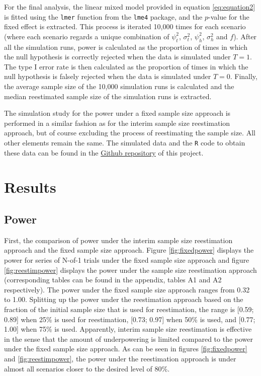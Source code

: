 \documentclass[AMA,STIX1COL,]{WileyNJD-v2}
\begin{document}
For the final analysis, the linear mixed model provided in equation \eqref{eq:equation2} is fitted using the \texttt{lmer} function from the \texttt{lme4} package, and the \(p\)-value for the fixed effect is extracted. This process is iterated 10,000 times for each scenario (where each scenario regards a unique combination of \(\psi_t^2\), \(\sigma_t^2\), \(\psi_h^2\), \(\sigma_h^2\) and \(f\)). After all the simulation runs, power is calculated as the proportion of times in which the null hypothesis is correctly rejected when the data is simulated under \(T=1\). The type I error rate is then calculated as the proportion of times in which the null hypothesis is falsely rejected when the data is simulated under \(T=0\). Finally, the average sample size of the 10,000 simulation runs is calculated and the median reestimated sample size of the simulation runs is extracted.

The simulation study for the power under a fixed sample size approach is performed in a similar fashion as for the interim sample size reestimation approach, but of course excluding the process of reestimating the sample size. All other elements remain the same. The simulated data and the \texttt{R} code to obtain these data can be found in the \href{https://github.com/daphneweemering/MasterThesis}{Github repository} of this project.

\hypertarget{results}{%
\section{Results}\label{results}}

\hypertarget{power}{%
\subsection{Power}\label{power}}

First, the comparison of power under the interim sample size reestimation approach and the fixed sample size approach. Figure \ref{fig:fixedpower} displays the power for series of N-of-1 trials under the fixed sample size approach and figure \ref{fig:reestimpower} displays the power under the sample size reestimation approach (corresponding tables can be found in the appendix, tables A1 and A2 respectively). The power under the fixed sample size approach ranges from 0.32 to 1.00. Splitting up the power under the reestimation approach based on the fraction of the initial sample size that is used for reestimation, the range is {[}0.59; 0.89{]} when 25\% is used for reestimation, {[}0.73; 0.97{]} when 50\% is used, and {[}0.77; 1.00{]} when 75\% is used. Apparently, interim sample size reestimation is effective in the sense that the amount of underpowering is limited compared to the power under the fixed sample size approach. As can be seen in figures \ref{fig:fixedpower} and \ref{fig:reestimpower}, the power under the reestimation approach is under almost all scenarios closer to the desired level of 80\%.
\end{document}
